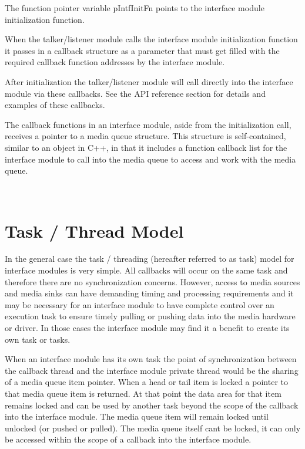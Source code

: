 The function pointer variable {\ttfamily p\+Intf\+Init\+Fn} points to the interface module initialization function.

When the talker/listener module calls the interface module initialization function it passes in a callback structure as a parameter that must get filled with the required callback function addresses by the interface module.

After initialization the talker/listener module will call directly into the interface module via these callbacks. See the A\+PI reference section for details and examples of these callbacks.

The callback functions in an interface module, aside from the initialization call, receives a pointer to a media queue structure. This structure is self-\/contained, similar to an object in C++, in that it includes a function callback list for the interface module to call into the media queue to access and work with the media queue.

~\newline
\hypertarget{sdk_avtp_interface_module_dev_sdk_avtp_intf_module_task}{}\section{Task / Thread Model }\label{sdk_avtp_interface_module_dev_sdk_avtp_intf_module_task}
In the general case the task / threading (hereafter referred to as task) model for interface modules is very simple. All callbacks will occur on the same task and therefore there are no synchronization concerns. However, access to media sources and media sinks can have demanding timing and processing requirements and it may be necessary for an interface module to have complete control over an execution task to ensure timely pulling or pushing data into the media hardware or driver. In those cases the interface module may find it a benefit to create its own task or tasks.

When an interface module has its own task the point of synchronization between the callback thread and the interface module private thread would be the sharing of a media queue item pointer. When a head or tail item is locked a pointer to that media queue item is returned. At that point the data area for that item remains locked and can be used by another task beyond the scope of the callback into the interface module. The media queue item will remain locked until unlocked (or pushed or pulled). The media queue itself can\textquotesingle{}t be locked, it can only be accessed within the scope of a callback into the interface module.

